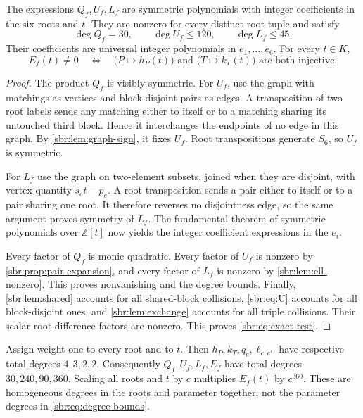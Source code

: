 \documentclass[11pt,letterpaper]{article}
\numberwithin{equation}{section}
\theoremstyle{definition}
\theoremstyle{remark}
\newcommand{\ZZ}{\mathbb Z}
\begin{document}
\begin{proposition}
\label{sbr:prop:obstruction}
The expressions $Q_f,U_f,L_f$ are symmetric polynomials with integer
coefficients in the six roots and $t$. They are nonzero for every distinct
root tuple and satisfy
\begin{equation}
 \deg Q_f=30,\qquad \deg U_f\le120,\qquad \deg L_f\le45.
 \label{sbr:eq:degree-bounds}
\end{equation}
Their coefficients are universal integer polynomials in $e_1,\ldots,e_6$.
For every $t\in K$,
\begin{equation}
 E_f(t)\ne0
 \quad\Longleftrightarrow\quad
 \bigl(P\mapsto h_P(t)\bigr)\text{ and }
 \bigl(T\mapsto k_T(t)\bigr)\text{ are both injective}.
 \label{sbr:eq:exact-test}
\end{equation}
\end{proposition}
\begin{proof}
The product $Q_f$ is visibly symmetric. For $U_f$, use the graph with
matchings as vertices and block-disjoint pairs as edges. A transposition
of two root labels sends any matching either to itself or to a matching
sharing its untouched third block. Hence it interchanges the endpoints of
no edge in this graph. By \cref{sbr:lem:graph-sign}, it fixes $U_f$. Root
transpositions generate $S_6$, so $U_f$ is symmetric.

For $L_f$ use the graph on two-element subsets, joined when they are
disjoint, with vertex quantity $s_et-p_e$. A root transposition sends a
pair either to itself or to a pair sharing one root. It therefore reverses
no disjointness edge, so the same argument proves symmetry of $L_f$.
The fundamental theorem of symmetric polynomials over $\ZZ[t]$ now yields
the integer coefficient expressions in the $e_i$.

Every factor of $Q_f$ is monic quadratic. Every factor of $U_f$ is nonzero
by \cref{sbr:prop:pair-expansion}, and every factor of $L_f$ is nonzero by
\cref{sbr:lem:ell-nonzero}. This proves nonvanishing and the degree bounds.
Finally, \cref{sbr:lem:shared} accounts for all shared-block collisions,
\cref{sbr:eq:U} accounts for all block-disjoint ones, and
\cref{sbr:lem:exchange} accounts for all triple collisions. Their scalar
root-difference factors are nonzero. This proves \cref{sbr:eq:exact-test}.
\end{proof}

\begin{remark}
Assign weight one to every root and to $t$. Then $h_P,k_T,q_e,\ell_{e,e'}$
have respective total degrees $4,3,2,2$. Consequently $Q_f,U_f,L_f,E_f$
have total degrees $30,240,90,360$. Scaling all roots and $t$ by $c$
multiplies $E_f(t)$ by $c^{360}$. These are homogeneous degrees in the
roots and parameter together, not the parameter degrees in
\cref{sbr:eq:degree-bounds}.
\end{remark}
\end{document}
